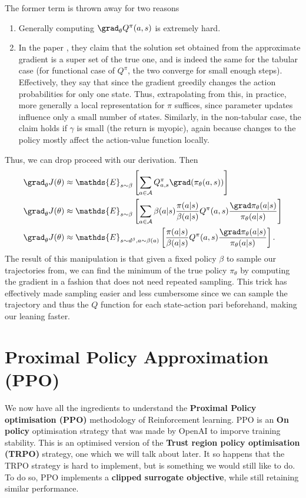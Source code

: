 The former term is thrown away for two reasons
\begin{enumerate}
    \item Generally computing $\grad_{\theta} Q^{\pi}(a,s)$ is extremely hard.
    \item In the paper \cite{degris_2013:offpolicyactorcritic}, they claim that the solution set obtained from the approximate gradient is a super set of the true one, and is indeed the same for the tabular case (for functional case of $Q^{\pi}$, the two converge for small enough steps). Effectively, they say that since the gradient greedily changes the action probabilities for only one state. Thus, extrapolating from this, in practice, more generally a local representation for $\pi$ suffices, since parameter updates influence only a small number of states. Similarly, in the non-tabular case, the claim holds if $\gamma$ is small (the return is myopic), again because changes to the policy mostly affect the action-value function locally.
\end{enumerate}
Thus, we can drop proceed with our derivation. Then 
\begin{align}
    \grad_{\theta}J(\theta) &\approx \mathds{E}_{s\sim\beta}\left[\sum_{a\in\mathcal{A}}  Q^{\pi}_{a,s} \grad(\pi_{\theta}(a,s))\right ] \\
    \grad_{\theta}J(\theta) &\approx \mathds{E}_{s\sim\beta}\left[\sum_{a\in\mathcal{A}}\beta(a|s) \frac{\pi(a|s)}{\beta(a|s)} Q^{\pi}(a,s) \frac{\grad\pi_{\theta}(a|s)}{\pi_{\theta}(a|s)}\right ] \\
    \grad_{\theta}J(\theta) &\approx \mathds{E}_{s\sim d^{\beta},a\sim \beta(a)}\left[\frac{\pi(a|s)}{\beta(a|s)} Q^{\pi}(a,s) \frac{\grad\pi_{\theta}(a|s)}{\pi_{\theta}(a|s)}\right ].
\end{align}
The result of this manipulation is that given a fixed policy $\beta$ to sample our trajectories from, we can find the minimum of the true policy $\pi_{\theta}$ by computing the gradient in a fashion that does not need repeated sampling. This trick has effectively made sampling easier and less cumbersome since we can sample the trajectory and thus the $Q$ function for each state-action pari beforehand, making our leaning faster.
\section{Proximal Policy Approximation (PPO)}
We now have all the ingredients to understand the \textbf{Proximal Policy optimisation (PPO)} methodology of Reinforcement learning. PPO is an \textbf{On policy} optimisation strategy that was made by OpenAI \cite{schulman_2017:proximal_policy_optimization_algorithms} to imporve training stability. This is an optimised version of the \textbf{Trust region policy optimisation (TRPO)} strategy, one which we will talk about later. It so happens that the TRPO strategy is hard to implement, but is something we would still like to do. To do so, PPO implements a \textbf{clipped surrogate objective}, while still retaining similar performance.
